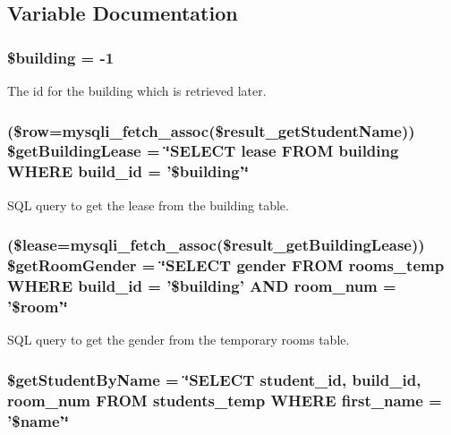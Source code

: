\subsection{\-Variable \-Documentation}
\hypertarget{getRoomByName_8php_a903ab1c50249715a442ce81e6d5ba775}{
\subsubsection[{\$building}]{\setlength{\rightskip}{0pt plus 5cm}\$building = -\/1}}\label{getRoomByName_8php_a903ab1c50249715a442ce81e6d5ba775}
\-The id for the building which is retrieved later. \hypertarget{getRoomByName_8php_a8befb25356d16681c16aaff83db4e3fc}{
\subsubsection[{\$get\-Building\-Lease}]{ (\$row=mysqli\-\_\-fetch\-\_\-assoc(\$result\-\_\-get\-Student\-Name)) \$get\-Building\-Lease = \char`\"{}\-S\-E\-L\-E\-C\-T lease \-F\-R\-O\-M building \-W\-H\-E\-R\-E build\-\_\-id = '\$building'\char`\"{}}}\label{getRoomByName_8php_a8befb25356d16681c16aaff83db4e3fc}
\-S\-Q\-L query to get the lease from the building table. \hypertarget{getRoomByName_8php_a65a823b86bd329b8545e10df6a4bc325}{
\subsubsection[{\$get\-Room\-Gender}]{ (\$lease=mysqli\-\_\-fetch\-\_\-assoc(\$result\-\_\-get\-Building\-Lease)) \$get\-Room\-Gender = \char`\"{}\-S\-E\-L\-E\-C\-T gender \-F\-R\-O\-M rooms\-\_\-temp \-W\-H\-E\-R\-E build\-\_\-id = '\$building' \-A\-N\-D room\-\_\-num = '\$room'\char`\"{}}}\label{getRoomByName_8php_a65a823b86bd329b8545e10df6a4bc325}
\-S\-Q\-L query to get the gender from the temporary rooms table. \hypertarget{getRoomByName_8php_a9c22ac0190343cdfc8749288791a05cf}{
\subsubsection[{\$get\-Student\-By\-Name}]{\setlength{\rightskip}{0pt plus 5cm}\$get\-Student\-By\-Name = \char`\"{}\-S\-E\-L\-E\-C\-T student\-\_\-id, build\-\_\-id, room\-\_\-num \-F\-R\-O\-M students\-\_\-temp \-W\-H\-E\-R\-E first\-\_\-name = '\$name'\char`\"{}}}\label{getRoomByName_8php_a9c22ac0190343cdfc8749288791a05cf}
